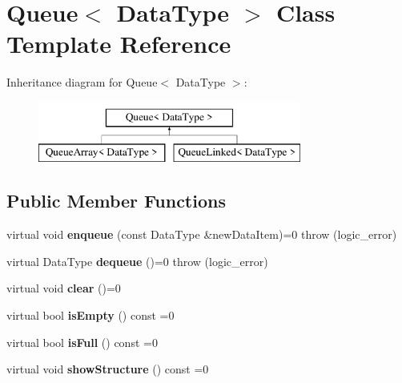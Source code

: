 \hypertarget{class_queue}{\section{Queue$<$ Data\+Type $>$ Class Template Reference}
\label{class_queue}
}
Inheritance diagram for Queue$<$ Data\+Type $>$\+:\begin{figure}[H]
\begin{center}
\leavevmode
\includegraphics[height=2.000000cm]{class_queue}
\end{center}
\end{figure}
\subsection*{Public Member Functions}
\begin{DoxyCompactItemize}
\item 
\hypertarget{class_queue_a4e0052bab8c2fb742a16a77d73ec3d5a}{virtual void {\bfseries enqueue} (const Data\+Type \&new\+Data\+Item)=0  throw (logic\+\_\+error)}\label{class_queue_a4e0052bab8c2fb742a16a77d73ec3d5a}

\item 
\hypertarget{class_queue_afde1535196f515caba0aa5cfbe62d329}{virtual Data\+Type {\bfseries dequeue} ()=0  throw (logic\+\_\+error)}\label{class_queue_afde1535196f515caba0aa5cfbe62d329}

\item 
\hypertarget{class_queue_afba4d82c9a20859bb6397bd73c230cdd}{virtual void {\bfseries clear} ()=0}\label{class_queue_afba4d82c9a20859bb6397bd73c230cdd}

\item 
\hypertarget{class_queue_a1b8e1c0b8bb621de8d4f20c011176bd2}{virtual bool {\bfseries is\+Empty} () const =0}\label{class_queue_a1b8e1c0b8bb621de8d4f20c011176bd2}

\item 
\hypertarget{class_queue_ae64751e270709a705d49e6168e64ade8}{virtual bool {\bfseries is\+Full} () const =0}\label{class_queue_ae64751e270709a705d49e6168e64ade8}

\item 
\hypertarget{class_queue_a7db7279a763ca59f7fef354759beab17}{virtual void {\bfseries show\+Structure} () const =0}\label{class_queue_a7db7279a763ca59f7fef354759beab17}

\end{DoxyCompactItemize}
